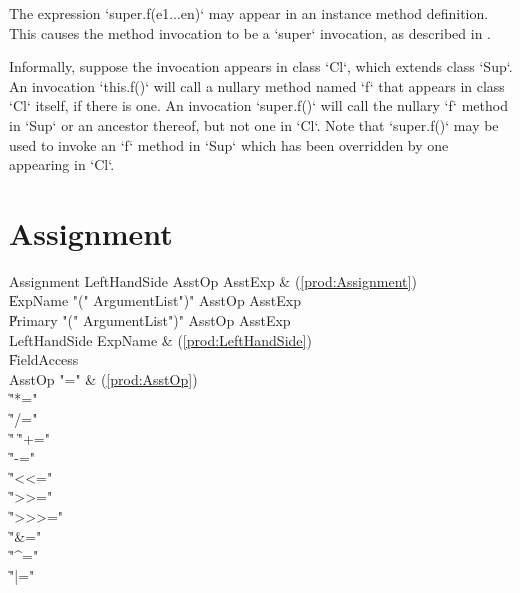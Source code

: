 The expression \xcd`super.f(e1...en)` may appear in an instance method
definition.   This causes the method invocation to be a \xcd`super`
invocation, as described in .  

Informally, suppose the invocation appears in class \xcd`Cl`, which extends
class \xcd`Sup`. An invocation \xcd`this.f()` will call a nullary method named
\xcd`f` that appears in class \xcd`Cl` itself, if there is one.  An invocation
\xcd`super.f()` will call the nullary  \xcd`f` method in \xcd`Sup` or an
ancestor thereof, but not one in \xcd`Cl`.  Note that \xcd`super.f()` may be
used to invoke an \xcd`f` method in \xcd`Sup` which has been overridden by one
appearing in \xcd`Cl`.  


\section{Assignment}\label{AssignmentStatement}

\begin{bbgrammar}
          Assignment \: LeftHandSide AsstOp AsstExp & (\ref{prod:Assignment}) \\
                     \| ExpName  \xcd"(" ArgumentList\opt \xcd")" AsstOp AsstExp \\
                     \| Primary  \xcd"(" ArgumentList\opt \xcd")" AsstOp AsstExp \\
        LeftHandSide \: ExpName & (\ref{prod:LeftHandSide}) \\
                     \| FieldAccess \\
              AsstOp \: \xcd"=" & (\ref{prod:AsstOp}) \\
                     \| \xcd"*=" \\
                     \| \xcd"/=" \\
                     \| \xcd"%
                     \| \xcd"+=" \\
                     \| \xcd"-=" \\
                     \| \xcd"<<=" \\
                     \| \xcd">>=" \\
                     \| \xcd">>>=" \\
                     \| \xcd"&=" \\
                     \| \xcd"^=" \\
                     \| \xcd"|=" \\
\end{bbgrammar}



